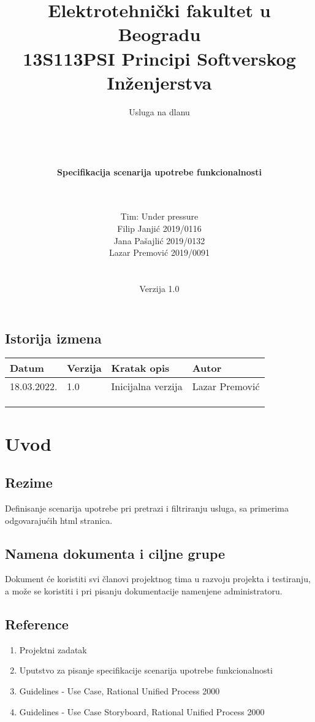 \documentclass[a4paper,12pt]{report}
\title{\Large Elektrotehnički fakultet u Beogradu \\ 13S113PSI Principi Softverskog Inženjerstva}
\author{\Huge Usluga na dlanu\\ \ \\ \ \\ \ \\ \ \\
	\Large \textbf{Specifikacija scenarija upotrebe funkcionalnosti}\\\Large \textbf{\genitivfunkcionalnosti} \\ \ \\}
\date{\Large   Tim: Under pressure \\ Filip Janjić 2019/0116 \\ Jana Pašajlić 2019/0132 \\ Lazar Premović 2019/0091  \\ \  \\ \  \\
	\large Verzija 1.0}
\newcommand{\dativfunkcionalnosti }{pretrazi i filtriranju usluga}
\newcommand{\inicijalniautor}{Lazar Premović}
\newcommand{\inicijalnidatum}{18.03.2022.}
\begin{document}
	
	\maketitle
	
	\begin{center}
		\section*{Istorija izmena}
			\begin{tabular}{ |l|l|l|l| }
				\hline
				\textbf{Datum} & \textbf{Verzija} & \textbf{Kratak opis} & \textbf{Autor} \\ 
				\hline
				\inicijalnidatum & 1.0  & Inicijalna verzija & \inicijalniautor \\
				\hline
				&  & &  \\
				\hline
				&  &  &  \\
				\hline
				&  &  &  \\
				\hline
			\end{tabular}
	\end{center}
	
	\newpage
	
	\tableofcontents
	
	\newpage
	
	\section{Uvod}
		\subsection{Rezime}
			Definisanje scenarija upotrebe pri \dativfunkcionalnosti, sa primerima odgovarajućih html stranica.
		\subsection{Namena dokumenta i ciljne grupe}
			Dokument će koristiti svi članovi projektnog tima u razvoju projekta i testiranju, a može se koristiti i pri pisanju dokumentacije namenjene administratoru.
		\subsection{Reference}
			\begin{enumerate}
				\item Projektni zadatak
				\item Uputstvo za pisanje specifikacije scenarija upotrebe funkcionalnosti
				\item Guidelines - Use Case, Rational Unified Process 2000
				\item Guidelines - Use Case Storyboard, Rational Unified Process 2000
			\end{enumerate}
\end{document}
